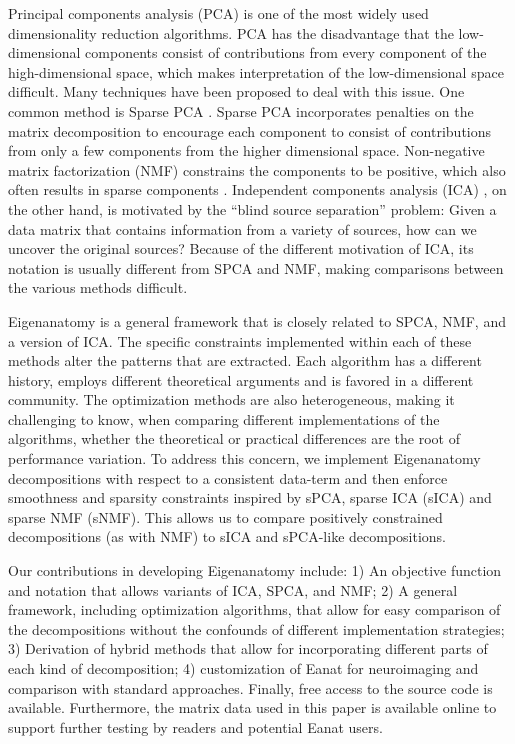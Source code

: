 \documentclass{elsarticle}\usepackage{graphicx, color}
\begin{document}
Principal components analysis (PCA) is one of the most widely used
dimensionality reduction algorithms.  PCA has the disadvantage that
the low-dimensional components consist of contributions from every
component of the high-dimensional space, which makes interpretation of
the low-dimensional space difficult.  Many techniques have been
proposed to deal with this issue.  One common method is Sparse PCA
\cite{jolliffe_simplified_2000,shen2008sparse,guan2009sparse}.  Sparse
PCA incorporates penalties on the matrix decomposition to encourage
each component to consist of contributions from only a few components
from the higher dimensional space.  Non-negative matrix factorization
(NMF) \cite{paatero1994positive} constrains the components to be
positive, which also often results in sparse components
\cite{lee_learning_1999}.  Independent components analysis (ICA)
\cite{hyvarinen2000independent}, on the other hand, is motivated by
the ``blind source separation'' problem: Given a data matrix that
contains information from a variety of sources, how can we uncover the
original sources?  Because of the different motivation of ICA, its
notation is usually different from SPCA and NMF, making comparisons
between the various methods difficult.  


Eigenanatomy is a general framework that is closely related to SPCA,
NMF, and a version of ICA.  The specific constraints implemented
within each of these methods alter the patterns that are extracted.
Each algorithm has a different history, employs different theoretical
arguments and is favored in a different community.  The optimization
methods are also heterogeneous, making it challenging to know, when
comparing different implementations of the algorithms, whether the
theoretical or practical differences are the root of performance
variation. To address this concern, we implement Eigenanatomy
decompositions with respect to a consistent data-term and then enforce
smoothness and sparsity constraints inspired by sPCA, sparse ICA
(sICA) and sparse NMF (sNMF).  This allows us to compare positively
constrained decompositions (as with NMF) to sICA and sPCA-like
decompositions.

Our contributions in developing Eigenanatomy include: 1) An objective
function and notation that allows variants of ICA, SPCA, and NMF; 2) A
general framework, including optimization algorithms, that allow for
easy comparison of the decompositions without the confounds of
different implementation strategies; 3) Derivation of hybrid methods
that allow for incorporating different parts of each kind of
decomposition; 4) customization of Eanat for neuroimaging and
comparison with standard approaches. Finally, free access to the
source code is available.  Furthermore, the matrix data used in this
paper is available online to support further testing by readers and
potential Eanat users.
\end{document}
